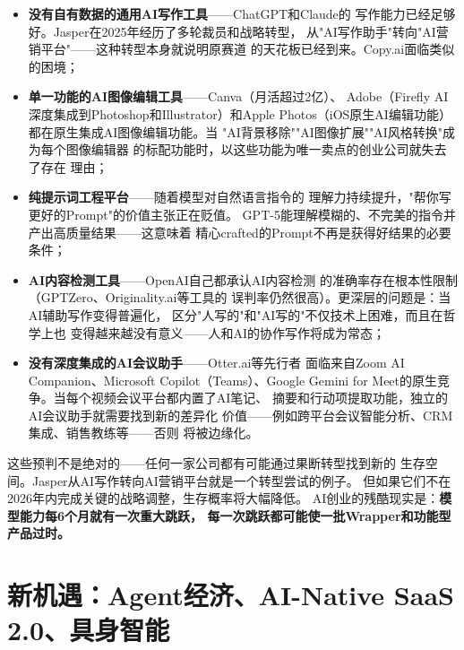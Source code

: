 \begin{itemize}
  \item \textbf{没有自有数据的通用AI写作工具}——ChatGPT和Claude的
    写作能力已经足够好。Jasper在2025年经历了多轮裁员和战略转型，
    从"AI写作助手"转向"AI营销平台"——这种转型本身就说明原赛道
    的天花板已经到来。Copy.ai面临类似的困境；

  \item \textbf{单一功能的AI图像编辑工具}——Canva（月活超过2亿）、
    Adobe（Firefly AI深度集成到Photoshop和Illustrator）和Apple
    Photos（iOS原生AI编辑功能）都在原生集成AI图像编辑功能。当
    "AI背景移除""AI图像扩展""AI风格转换"成为每个图像编辑器
    的标配功能时，以这些功能为唯一卖点的创业公司就失去了存在
    理由；

  \item \textbf{纯提示词工程平台}——随着模型对自然语言指令的
    理解力持续提升，"帮你写更好的Prompt"的价值主张正在贬值。
    GPT-5能理解模糊的、不完美的指令并产出高质量结果——这意味着
    精心crafted的Prompt不再是获得好结果的必要条件；

  \item \textbf{AI内容检测工具}——OpenAI自己都承认AI内容检测
    的准确率存在根本性限制（GPTZero、Originality.ai等工具的
    误判率仍然很高）。更深层的问题是：当AI辅助写作变得普遍化，
    区分"人写的"和"AI写的"不仅技术上困难，而且在哲学上也
    变得越来越没有意义——人和AI的协作写作将成为常态；

  \item \textbf{没有深度集成的AI会议助手}——Otter.ai等先行者
    面临来自Zoom AI Companion、Microsoft Copilot（Teams）、Google
    Gemini for Meet的原生竞争。当每个视频会议平台都内置了AI笔记、
    摘要和行动项提取功能，独立的AI会议助手就需要找到新的差异化
    价值——例如跨平台会议智能分析、CRM集成、销售教练等——否则
    将被边缘化。
\end{itemize}

这些预判不是绝对的——任何一家公司都有可能通过果断转型找到新的
生存空间。Jasper从AI写作转向AI营销平台就是一个转型尝试的例子。
但如果它们不在2026年内完成关键的战略调整，生存概率将大幅降低。
AI创业的残酷现实是：\textbf{模型能力每6个月就有一次重大跳跃，
每一次跳跃都可能使一批Wrapper和功能型产品过时。}


\section{新机遇：Agent经济、AI-Native SaaS 2.0、具身智能}
\label{sec:outlook-opportunities}

